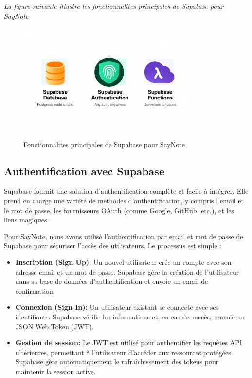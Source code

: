 \noindent
\textit{La figure suivante illustre les fonctionnalites principales de Supabase pour SayNote}
\begin{figure}[H]
\centering
\includegraphics[width=0.8\textwidth]{assets/docs/golobal-diagrams/supabase-feature.png}
\caption{Fonctionnalites principales de Supabase pour SayNote}
\label{fig:supabase-feature}
\end{figure}


\subsection{Authentification avec Supabase}

Supabase fournit une solution d'authentification complète et facile à intégrer. Elle prend en charge une variété de méthodes d'authentification, y compris l'email et le mot de passe, les fournisseurs OAuth (comme Google, GitHub, etc.), et les liens magiques.

Pour SayNote, nous avons utilisé l'authentification par email et mot de passe de Supabase pour sécuriser l'accès des utilisateurs. Le processus est simple :
\begin{itemize}
    \item \textbf{Inscription (Sign Up):} Un nouvel utilisateur crée un compte avec son adresse email et un mot de passe. Supabase gère la création de l'utilisateur dans sa base de données d'authentification et envoie un email de confirmation.
    \item \textbf{Connexion (Sign In):} Un utilisateur existant se connecte avec ses identifiants. Supabase vérifie les informations et, en cas de succès, renvoie un JSON Web Token (JWT).
    \item \textbf{Gestion de session:} Le JWT est utilisé pour authentifier les requêtes API ultérieures, permettant à l'utilisateur d'accéder aux ressources protégées. Supabase gère automatiquement le rafraîchissement des tokens pour maintenir la session active.
\end{itemize}

